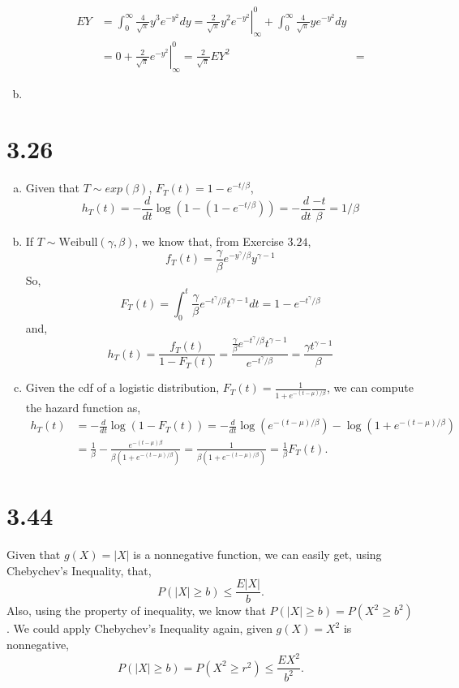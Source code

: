\documentclass[letter]{article}
\newcommand{\intzi}{\int_0^\infty}
\begin{document}
\begin{enumerate}[(a)]
    \begin{align*}
    EY & = \intzi \frac{4}{\sqrt{\pi}} y^3 e^{-y^2} dy = \left. \frac{2}{\sqrt{\pi}} y^2 e^{-y^2} \right|^0_\infty + \intzi \frac{4}{\sqrt{\pi}} y e^{-y^2} dy \\
    & = 0 + \left. \frac{2}{\sqrt{\pi}} e^{-y^2} \right|^0_\infty = \frac{2}{\sqrt{\pi}}
    EY^2 & = 
    \end{align*}

    \item
    \end{enumerate}

    \section*{3.26}
    \begin{enumerate}[(a)]
    \item Given that $T \sim exp(\beta)$, $F_T(t) = 1 - e^{-t/\beta}$, 
    \[
    h_T(t) = -\frac{d}{dt}\log(1-(1-e^{-t/\beta})) = -\frac{d}{dt}\frac{-t}{\beta} = 1/\beta
    \]
    \item If $T \sim \text{Weibull}(\gamma, \beta)$, we know that, from Exercise $3.24$, 
    \[
    f_T(t) = \frac{\gamma}{\beta} e^{-y^\gamma/\beta} y^{\gamma-1}
    \]
    So,
    \[
    F_T(t) = \int_0^t \frac{\gamma}{\beta} e^{-t^\gamma/\beta} t^{\gamma -1} dt = 1-e^{-t^\gamma/\beta}
    \]
    and,
    \[
    h_T(t) = \frac{f_T(t)}{1-F_T(t)} = \frac{\frac{\gamma}{\beta} e^{-t^\gamma/\beta} t^{\gamma-1}}{e^{-t^\gamma/\beta}} = \frac{\gamma t^{\gamma-1}}{\beta}
    \]
    \item Given the cdf of a logistic distribution, $F_T(t) = \frac{1}{1+e^{-(t-\mu)/\beta}}$, we can compute the hazard function as,
    \begin{align*}
    h_T(t) & = -\frac{d}{dt} \log(1-F_T(t)) = -\frac{d}{dt} \log(e^{-(t-\mu)/\beta}) - \log(1+e^{-(t-\mu)/\beta}) \\
    & = \frac{1}{\beta} - \frac{e^{-(t-\mu)\beta}}{\beta(1+e^{-(t-\mu)/\beta})} = \frac{1}{\beta(1+e^{-(t-\mu)/\beta})} = \frac{1}{\beta} F_T(t).
    \end{align*}
    \end{enumerate}

    \section*{3.44}
    Given that $g(X) = |X|$ is a nonnegative function, we can easily get, using Chebychev's Inequality, that,
    \[
    P(|X| \ge b) \le \frac{E|X|}{b}.
    \]
    Also, using the property of inequality, we know that $P(|X| \ge b) = P(X^2 \ge b^2)$. We could apply Chebychev's Inequality again, given $g(X) = X^2$ is nonnegative,
    \[
    P(|X| \ge b) = P(X^2 \ge r^2) \le \frac{EX^2}{b^2}.
    \]
    
\end{document}
